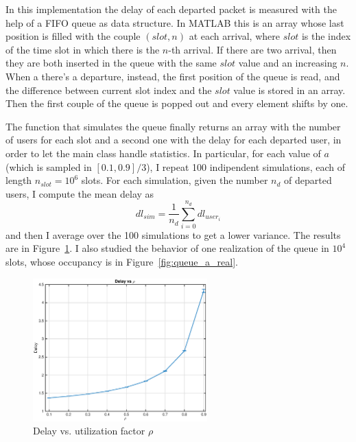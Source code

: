 \documentclass[10pt]{article}
\begin{document}
In this implementation the delay of each departed packet is measured with the help of a FIFO queue as data structure. In MATLAB this is an array whose last position is filled with the couple $(slot, n)$ at each arrival, where $slot$ is the index of the time slot in which there is the $n$-th arrival. If there are two arrival, then they are both inserted in the queue with the same $slot$ value and an increasing $n$. When a there's a departure, instead, the first position of the queue is read, and the difference between current slot index and the $slot$ value is stored in an array. Then the first couple of the queue is popped out and every element shifts by one. 

The function that simulates the queue finally returns an array with the number of users for each slot and a second one with the delay for each departed user, in order to let the main class handle statistics. In particular, for each value of $a$ (which is sampled in $[0.1, 0.9]/3$), I repeat 100 indipendent simulations, each of length $n_{slot} = 10^6$ slots. For each simulation, given the number $n_{d}$ of departed users, I compute the mean delay as 
\begin{equation}
  dl_{sim} = \frac{1}{n_d} \sum_{i = 0}^{n_d} dl_{user_i}
\end{equation}
and then I average over the 100 simulations to get a lower variance. The results are in Figure~\ref{fig:queue_a}.
I also studied the behavior of one realization of the queue in $10^4$ slots, whose occupancy is in Figure~\ref{fig:queue_a_real}.

\begin{figure}[h!]
\centering
  \includegraphics[width = 0.6\textwidth]{queue_a_dl}
  \caption{Delay vs. utilization factor $\rho$}
  \label{fig:queue_a}
\end{figure}
\end{document}
